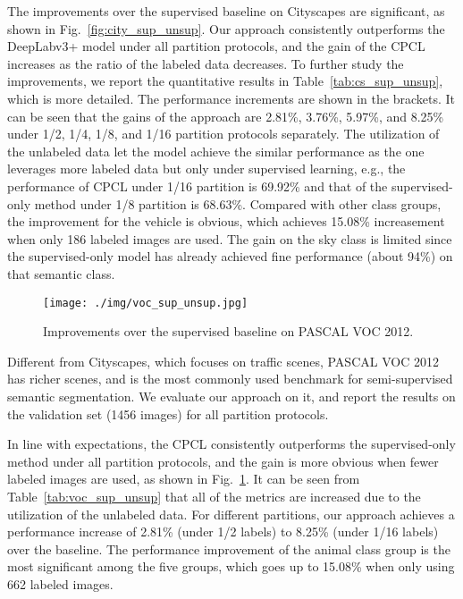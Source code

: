 \documentclass[journal]{IEEEtran}
\begin{document}
The improvements over the supervised baseline on Cityscapes are significant, as shown in Fig.~\ref{fig:city_sup_unsup}. Our approach consistently outperforms the 
DeepLabv3+ model under all partition protocols, and the gain of the CPCL increases as the ratio of the labeled data decreases. To further study the improvements, 
we report the quantitative results in Table~\ref{tab:cs_sup_unsup}, which is more detailed. The performance increments are shown in the brackets. It can be seen 
that the gains of the approach are 2.81\%, 3.76\%, 5.97\%, and 8.25\% under 1/2, 1/4, 1/8, and 1/16 partition protocols separately. The utilization of the unlabeled 
data let the model achieve the similar performance as the one leverages more labeled data but only under supervised learning, e.g., the performance of CPCL under 
1/16 partition is 69.92\% and that of the supervised-only method under 1/8 partition is 68.63\%. Compared with other class groups, the improvement for the vehicle 
is obvious, which achieves 15.08\% increasement when only 186 labeled images are used. The gain on the sky class is limited since the supervised-only model has already achieved 
fine performance (about 94\%) on that semantic class.

\begin{figure}[h]
  \centering
  \texttt{[image: ./img/voc\_sup\_unsup.jpg]}
  \caption{Improvements over the supervised baseline on PASCAL VOC 2012.}
  \label{fig:voc_sup_unsup}
\end{figure}

Different from Cityscapes, which focuses on traffic scenes, PASCAL VOC 2012 has richer scenes, and is the most commonly used benchmark for semi-supervised semantic 
segmentation. We evaluate our approach on it, and report the results on the validation set (1456 images) for all partition protocols.

In line with expectations, the CPCL consistently outperforms the supervised-only method under all partition protocols, and the gain is more obvious when fewer labeled 
images are used, as shown in Fig.~\ref{fig:voc_sup_unsup}. It can be seen from Table~\ref{tab:voc_sup_unsup} that all of the metrics are increased due to the 
utilization of the unlabeled data. For different partitions, our approach achieves a performance increase of 2.81\% (under 1/2 labels) to 8.25\% (under 1/16 labels) 
over the baseline. The performance improvement of the animal class group is the most significant among the five groups, which goes up to 15.08\% when only using 662 labeled 
images.
\end{document}

